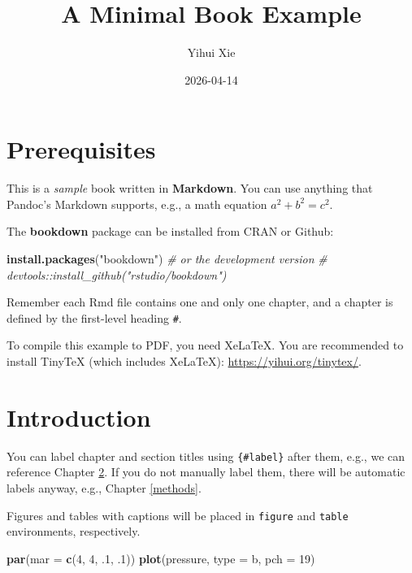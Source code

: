 \documentclass[
]{book}
\title{A Minimal Book Example}
\author{Yihui Xie}
\date{2026-04-14}
\newenvironment{Shaded}{\begin{snugshade}}{\end{snugshade}}
\newcommand{\AttributeTok}[1]{\textcolor[rgb]{0.13,0.29,0.53}{#1}}
\newcommand{\CommentTok}[1]{\textcolor[rgb]{0.56,0.35,0.01}{\textit{#1}}}
\newcommand{\DecValTok}[1]{\textcolor[rgb]{0.00,0.00,0.81}{#1}}
\newcommand{\FunctionTok}[1]{\textcolor[rgb]{0.13,0.29,0.53}{\textbf{#1}}}
\newcommand{\NormalTok}[1]{#1}
\newcommand{\StringTok}[1]{\textcolor[rgb]{0.31,0.60,0.02}{#1}}
\begin{document}
\maketitle

{
\setcounter{tocdepth}{1}
\tableofcontents
}
\chapter{Prerequisites}\label{prerequisites}

This is a \emph{sample} book written in \textbf{Markdown}. You can use anything that Pandoc's Markdown supports, e.g., a math equation \(a^2 + b^2 = c^2\).

The \textbf{bookdown} package can be installed from CRAN or Github:

\begin{Shaded}
\begin{Highlighting}[]
\FunctionTok{install.packages}\NormalTok{(}\StringTok{"bookdown"}\NormalTok{)}
\CommentTok{\# or the development version}
\CommentTok{\# devtools::install\_github("rstudio/bookdown")}
\end{Highlighting}
\end{Shaded}

Remember each Rmd file contains one and only one chapter, and a chapter is defined by the first-level heading \texttt{\#}.

To compile this example to PDF, you need XeLaTeX. You are recommended to install TinyTeX (which includes XeLaTeX): \url{https://yihui.org/tinytex/}.

\chapter{Introduction}\label{intro}

You can label chapter and section titles using \texttt{\{\#label\}} after them, e.g., we can reference Chapter \ref{intro}. If you do not manually label them, there will be automatic labels anyway, e.g., Chapter \ref{methods}.

Figures and tables with captions will be placed in \texttt{figure} and \texttt{table} environments, respectively.

\begin{Shaded}
\begin{Highlighting}[]
\FunctionTok{par}\NormalTok{(}\AttributeTok{mar =} \FunctionTok{c}\NormalTok{(}\DecValTok{4}\NormalTok{, }\DecValTok{4}\NormalTok{, .}\DecValTok{1}\NormalTok{, .}\DecValTok{1}\NormalTok{))}
\FunctionTok{plot}\NormalTok{(pressure, }\AttributeTok{type =} \StringTok{\textquotesingle{}b\textquotesingle{}}\NormalTok{, }\AttributeTok{pch =} \DecValTok{19}\NormalTok{)}
\end{Highlighting}
\end{Shaded}
\end{document}
